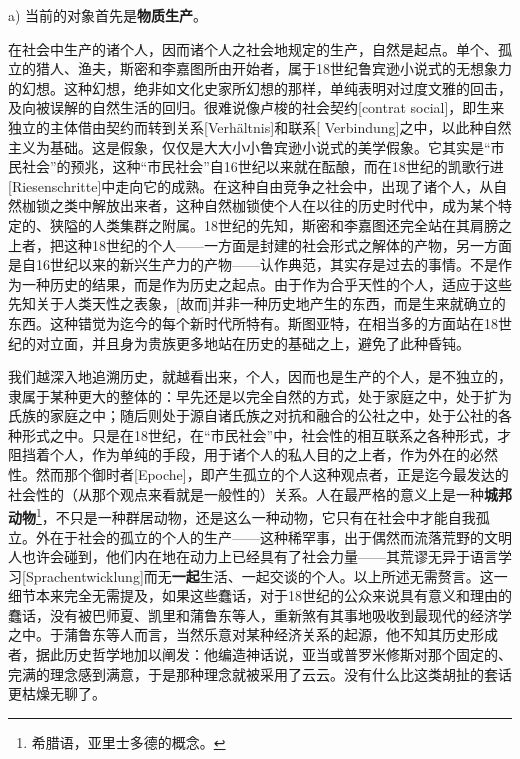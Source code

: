 \documentclass[a4paper,twoside,12pt]{ctexart}
\begin{document}
a) 当前的对象首先是\textbf{物质生产}。

在社会中生产的诸个人，因而诸个人之社会地规定的生产，自然是起点。单个、孤立的猎人、渔夫，斯密和李嘉图所由开始者，属于18世纪鲁宾逊小说式的无想象力的幻想。这种幻想，绝非如文化史家所幻想的那样，单纯表明对过度文雅的回击，及向被误解的自然生活的回归。很难说像卢梭的社会契约[contrat social]，即生来独立的主体借由契约而转到关系[Verhältnis]和联系[ Verbindung]之中，以此种自然主义为基础。这是假象，仅仅是大大小小鲁宾逊小说式的美学假象。它其实是“市民社会”的预兆，这种“市民社会”自16世纪以来就在酝酿，而在18世纪的凯歌行进[Riesenschritte]中走向它的成熟。在这种自由竞争之社会中，出现了诸个人，从自然枷锁之类中解放出来者，这种自然枷锁使个人在以往的历史时代中，成为某个特定的、狭隘的人类集群之附属。18世纪的先知，斯密和李嘉图还完全站在其肩膀之上者，把这种18世纪的个人——一方面是封建的社会形式之解体的产物，另一方面是自16世纪以来的新兴生产力的产物——认作典范，其实存是过去的事情。不是作为一种历史的结果，而是作为历史之起点。由于作为合乎天性的个人，适应于这些先知关于人类天性之表象，[故而]并非一种历史地产生的东西，而是生来就确立的东西。这种错觉为迄今的每个新时代所特有。斯图亚特，在相当多的方面站在18世纪的对立面，并且身为贵族更多地站在历史的基础之上，避免了此种昏钝。

我们越深入地追溯历史，就越看出来，个人，因而也是生产的个人，是不独立的，隶属于某种更大的整体的：早先还是以完全自然的方式，处于家庭之中，处于扩为氏族的家庭之中；随后则处于源自诸氏族之对抗和融合的公社之中，处于公社的各种形式之中。只是在18世纪，在“市民社会”中，社会性的相互联系之各种形式，才阻挡着个人，作为单纯的手段，用于诸个人的私人目的之上者，作为外在的必然性。然而那个御时者[Epoche]，即产生孤立的个人这种观点者，正是迄今最发达的社会性的（从那个观点来看就是一般性的）关系。人在最严格的意义上是一种\textbf{城邦动物}\footnote{希腊语，亚里士多德的概念。}，不只是一种群居动物，还是这么一种动物，它只有在社会中才能自我孤立。外在于社会的孤立的个人的生产——这种稀罕事，出于偶然而流落荒野的文明人也许会碰到，他们内在地在动力上已经具有了社会力量——其荒谬无异于语言学习[Sprachentwicklung]而无\textbf{一起}生活、一起交谈的个人。以上所述无需赘言。这一细节本来完全无需提及，如果这些蠢话，对于18世纪的公众来说具有意义和理由的蠢话，没有被巴师夏、凯里和蒲鲁东等人，重新煞有其事地吸收到最现代的经济学之中。于蒲鲁东等人而言，当然乐意对某种经济关系的起源，他不知其历史形成者，据此历史哲学地加以阐发：他编造神话说，亚当或普罗米修斯对那个固定的、完满的理念感到满意，于是那种理念就被采用了云云。没有什么比这类胡扯的套话更枯燥无聊了。
\end{document}
